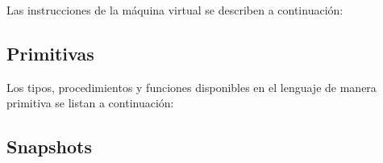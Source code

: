 \documentclass{article}
\begin{document}
Las instrucciones de la m\'aquina virtual se describen a continuaci\'on:



\subsection{Primitivas}

Los tipos, procedimientos y funciones disponibles en el lenguaje de manera primitiva se listan a continuaci\'on:



\subsection{Snapshots}
\end{document}
